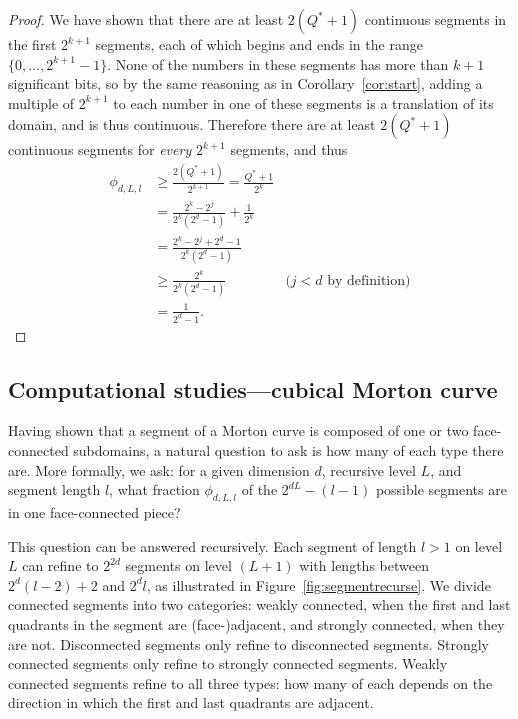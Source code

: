 \documentclass[a4paper,11pt]{article}
\newcommand{\figref}[1]{Figure~\ref{fig:#1}}
\newcommand{\seclab}[1]{\label{sec:#1}}
\begin{document}
\begin{proof}
  We have shown that there are at least $2(Q^*+1)$ continuous segments in the
  first $2^{k+1}$ segments, each of which begins and ends in the range
  $\{0,\dots,2^{k+1}-1\}$.  None of the numbers in these segments has more than
  $k+1$ significant bits, so by the same reasoning as in
  Corollary~\ref{cor:start}, adding a multiple of $2^{k+1}$ to each number in
  one of these segments is a translation of its domain, and is thus continuous.
  Therefore there are at least $2(Q^*+1)$ continuous segments for \emph{every}
  $2^{k+1}$ segments, and thus
\begin{equation}
    \begin{aligned}
      \phi_{d,L,l} &\geq \frac{2(Q^*+1)}{2^{k+1}} = \frac{Q^*+1}{2^k}
      \\
      &=
      \frac{2^k - 2^j}{2^k(2^d-1)} + \frac{1}{2^k}
      \\
      &=
      \frac{2^k - 2^j + 2^d - 1}{2^k(2^d-1)}
      \\
      &\geq
      \frac{2^k}{2^k(2^d-1)}
      & \text{($j < d$ by definition)}
      \\
      &=
      \frac{1}{2^d - 1}.
    \end{aligned}
  \end{equation}\end{proof}

\subsection{Computational studies---cubical Morton curve}
\seclab{numerical}

Having shown that a segment of a Morton curve is composed of one or two
face-connected subdomains, a natural question to ask is how many of each type
there are.  More formally, we ask: for a given dimension $d$, recursive level
$L$, and segment length $l$, what fraction $\phi_{d,L,l}$ of the
$2^{dL}-(l-1)$ possible segments are in one face-connected piece? 


This question can be answered recursively.  Each segment of length $l>1$ on
level $L$ can refine to $2^{2d}$ segments on level $(L+1)$ with lengths between
$2^d (l-2) + 2$ and $2^dl$, as illustrated in \figref{segmentrecurse}.  We
divide connected segments into two categories: weakly connected, when the
first and last quadrants in the segment are (face-)adjacent, and strongly connected,
when they are not.  Disconnected segments only refine to disconnected
segments.  Strongly connected segments only refine to strongly connected
segments.  Weakly connected segments refine to all three types: how many of
each depends on the direction in which the first and last quadrants are
adjacent.
\end{document}
